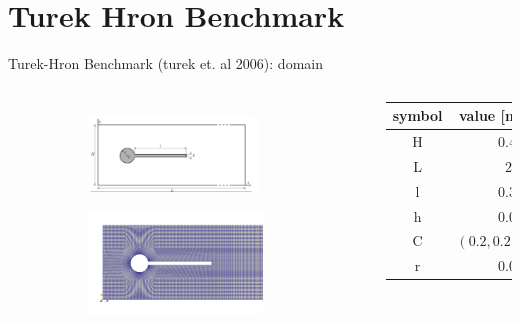 \documentclass[10pt,t]{beamer}
\begin{document}
\section{Turek Hron Benchmark}


\begin{frame}{Turek-Hron  Benchmark (turek et. al 2006): domain}


\begin{columns}
    \begin{figure}[t]
    \vspace*{-1.5cm}
    \hspace*{-0.2cm}
	\centering
	  \begin{subfigure}[t]{\textwidth}
    \centering
    \includegraphics[width=0.865\textwidth, trim=0 0 50 0, clip]{images/FSI2/FSI2.png}
  \end{subfigure}
  \begin{subfigure}[t]{\textwidth}
    \hspace{3pt}
    \includegraphics[width=0.89\textwidth]{images/FSI2/FSI2-mesh.png}
  \end{subfigure}
	
	
	
	
    \end{figure}
    
    	\scriptsize
		\begin{tabular}{ c | r } 
			symbol & value [m]  \\
			\hline
			H  & $0.41$     \\
			L  & $2.5$  \\
			l  & $0.35$  \\
			h  & $0.02$  \\
			C  & $\left(0.2,0.2 \right)$  \\
			r  & $0.05$  \\
			\end{tabular}


\end{columns}
\end{frame}
\end{document}
